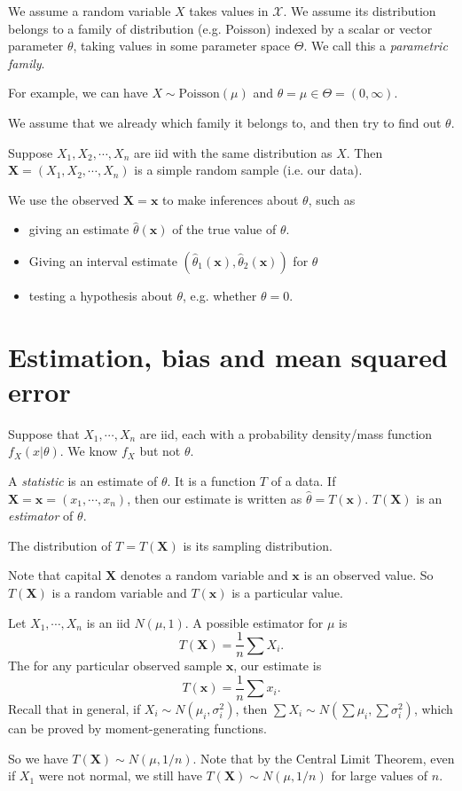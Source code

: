 \documentclass[a4paper]{article}
\begin{document}
We assume a random variable $X$ takes values in $\mathcal{X}$. We assume its distribution belongs to a family of distribution (e.g. Poisson) indexed by a scalar or vector parameter $\theta$, taking values in some parameter space $\Theta$. We call this a \emph{parametric family}.

For example, we can have $X\sim \text{Poisson}(\mu)$ and $\theta = \mu\in\Theta = (0, \infty)$.

We assume that we already which family it belongs to, and then try to find out $\theta$.

Suppose $X_1, X_2, \cdots, X_n$ are iid with the same distribution as $X$. Then $\mathbf{X} = (X_1, X_2, \cdots, X_n)$ is a simple random sample (i.e. our data).

We use the observed $\mathbf{X} = \mathbf{x}$ to make inferences about $\theta$, such as
\begin{itemize}
  \item giving an estimate $\hat{\theta}(\mathbf{x})$ of the true value of $\theta$.
  \item Giving an interval estimate $(\hat{\theta}_1(\mathbf{x}), \hat{\theta}_2(\mathbf{x}))$ for $\theta$
  \item testing a hypothesis about $\theta$, e.g. whether $\theta = 0$.
\end{itemize}
\section{Estimation, bias and mean squared error}
Suppose that $X_1, \cdots, X_n$ are iid, each with a probability density/mass function $f_X(x|\theta)$. We know $f_X$ but not $\theta$.

\begin{defi}[Statistic]
  A \emph{statistic} is an estimate of $\theta$. It is a function $T$ of a data. If $\mathbf{X} = \mathbf{x} = (x_1, \cdots, x_n)$, then our estimate is written as $\hat{\theta} = T(\mathbf{x})$. $T(\mathbf{X})$ is an \emph{estimator} of $\theta$.

  The distribution of $T = T(\mathbf{X})$ is its sampling distribution.

  Note that capital $\mathbf{X}$ denotes a random variable and $\mathbf{x}$ is an observed value. So $T(\mathbf{X})$ is a random variable and $T(\mathbf{x})$ is a particular value.
\end{defi}

\begin{eg}
  Let $X_1, \cdots, X_n$ is an iid $N(\mu, 1)$. A possible estimator for $\mu$ is
  \[
    T(\mathbf{X}) = \frac{1}{n}\sum X_i.
  \]
  The for any particular observed sample $\mathbf{x}$, our estimate is
  \[
    T(\mathbf{x}) = \frac{1}{n}\sum x_i.
  \]
  Recall that in general, if $X_i \sim N(\mu_i, \sigma_i^2)$, then $\sum X_i \sim N(\sum \mu_i, \sum \sigma_i^2)$, which can be proved by moment-generating functions.
  
  So we have $T(\mathbf{X})\sim N(\mu, 1/n)$. Note that by the Central Limit Theorem, even if $X_1$ were not normal, we still have $T(\mathbf{X})\sim N(\mu, 1/n)$ for large values of $n$.
\end{eg}
\end{document}
